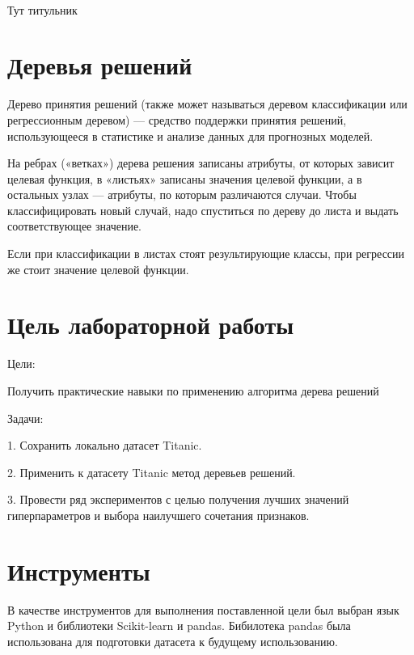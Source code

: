 \documentclass[a4paper,12pt]{article}
\begin{document}
\begin{titlepage}
\newpage

\

Тут титульник
\end{titlepage}

\newpage
\tableofcontents
\setcounter{page}{2}


\newpage\section{Деревья решений} 
	Дерево принятия решений (также может называться деревом классификации или регрессионным деревом) — средство поддержки принятия решений, использующееся в статистике и анализе данных для прогнозных моделей. 
	
	\vspace{0.5cm}
	На ребрах («ветках») дерева решения записаны атрибуты, от которых зависит целевая функция, в «листьях» записаны значения целевой функции, а в остальных узлах — атрибуты, по которым различаются случаи. Чтобы классифицировать новый случай, надо спуститься по дереву до листа и выдать соответствующее значение. 
	
	\vspace{0.5cm}
	Если при классификации в листах стоят результирующие классы, при регрессии же стоит значение целевой функции.
	
	
	
\newpage\section{Цель лабораторной работы} 
	Цели: 
	\vspace{0.5cm}
	
	Получить практические навыки по применению алгоритма дерева решений
	
	\vspace{0.5cm}
	Задачи: 
	
	\vspace{0.5cm}
	1. Сохранить локально датасет Titanic.
	
	\vspace{0.5cm}
	2. Применить к датасету Titanic метод деревьев решений.
	
	\vspace{0.5cm}
	3. Провести ряд экспериментов с целью получения лучших значений гиперпараметров и выбора наилучшего сочетания признаков.
	
\newpage\section{Инструменты} 
	В качестве инструментов для выполнения поставленной цели был выбран язык Python и библиотеки Scikit-learn и pandas.
	Бибилотека pandas была использована для подготовки датасета к будущему использованию.
	
\end{document}
